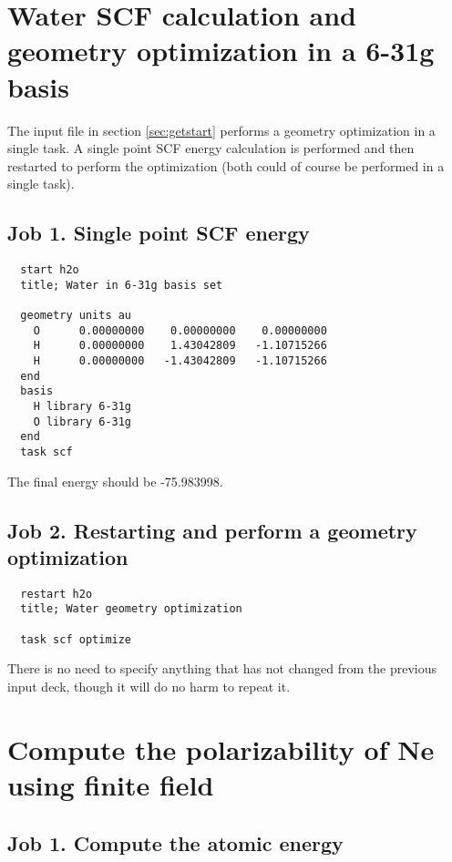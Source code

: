\label{sec:sample}
\section{Water SCF calculation and geometry optimization in a 6-31g basis}
\label{sec:sample1}

The input file in section \ref{sec:getstart} performs a geometry optimization
in a single task. A single point SCF energy calculation is performed and then
restarted to perform the optimization (both could of course be
performed in a single task).

\subsection{Job 1.  Single point SCF energy}

\begin{verbatim}
  start h2o
  title; Water in 6-31g basis set

  geometry units au
    O      0.00000000    0.00000000    0.00000000
    H      0.00000000    1.43042809   -1.10715266
    H      0.00000000   -1.43042809   -1.10715266
  end
  basis
    H library 6-31g
    O library 6-31g
  end
  task scf
\end{verbatim}

The final energy should be -75.983998.

\subsection{Job 2. Restarting and perform a geometry optimization}

\begin{verbatim}
  restart h2o
  title; Water geometry optimization

  task scf optimize
\end{verbatim}

There is no need to specify anything that has not changed from the
previous input deck, though it will do no harm to repeat it.

\section{Compute the polarizability of Ne using finite field}
\label{sec:sample2}

\subsection{Job 1. Compute the atomic energy}

